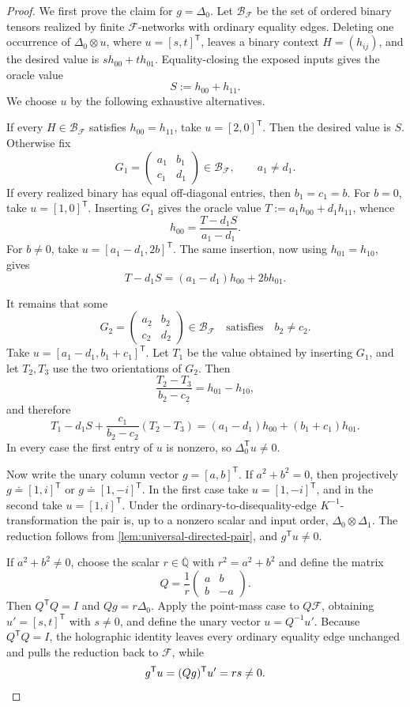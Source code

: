\documentclass[11pt,letterpaper,onecolumn]{article}
\theoremstyle{plain}
\theoremstyle{definition}
\theoremstyle{remark}
\newcommand{\AlgNums}{\overline{\mathbb Q}}
\newcommand{\cF}{\mathcal F}
\newcommand{\DeltaZero}{\Delta_0}
\newcommand{\DeltaOne}{\Delta_1}
\begin{document}
\begin{proof}
We first prove the claim for \(g=\DeltaZero\).  Let \(\mathcal B_\cF\) be
the set of ordered binary tensors realized by finite \(\cF\)-networks with
ordinary equality edges.  Deleting one occurrence of
\(\DeltaZero\otimes u\), where \(u=[s,t]^{\mathsf T}\), leaves a binary
context \(H=(h_{ij})\), and the desired value is
\(sh_{00}+th_{01}\).  Equality-closing the exposed inputs gives the oracle value
\[
  S:=h_{00}+h_{11}.
\]
We choose \(u\) by the following exhaustive alternatives.

If every \(H\in\mathcal B_\cF\) satisfies \(h_{00}=h_{11}\), take
\(u=[2,0]^{\mathsf T}\). Then the desired value is \(S\).  Otherwise fix
\[
  G_1=\begin{pmatrix}a_1&b_1\\c_1&d_1\end{pmatrix}
  \in\mathcal B_\cF,
  \qquad a_1\ne d_1.
\]
If every realized binary has equal off-diagonal entries, then
\(b_1=c_1=b\).  For \(b=0\), take \(u=[1,0]^{\mathsf T}\).  Inserting
\(G_1\) gives the oracle value \(T:=a_1h_{00}+d_1h_{11}\), whence
\[
  h_{00}=\frac{T-d_1S}{a_1-d_1}.
\]
For \(b\ne0\), take \(u=[a_1-d_1,2b]^{\mathsf T}\).  The same insertion,
now using \(h_{01}=h_{10}\), gives
\[
  T-d_1S=(a_1-d_1)h_{00}+2bh_{01}.
\]

It remains that some
\[
  G_2=\begin{pmatrix}a_2&b_2\\c_2&d_2\end{pmatrix}
  \in\mathcal B_\cF
  \quad\text{satisfies}\quad b_2\ne c_2.
\]
Take \(u=[a_1-d_1,b_1+c_1]^{\mathsf T}\).  Let \(T_1\) be the value obtained
by inserting \(G_1\), and let \(T_2,T_3\) use the two orientations of
\(G_2\).  Then
\[
  \frac{T_2-T_3}{b_2-c_2}=h_{01}-h_{10},
\]
and therefore
\[
  T_1-d_1S+
  \frac{c_1}{b_2-c_2}(T_2-T_3)
  =(a_1-d_1)h_{00}+(b_1+c_1)h_{01}.
\]
In every case the first entry of \(u\) is nonzero, so
\(\DeltaZero^{\mathsf T}u\ne0\).

Now write the unary column vector \(g=[a,b]^{\mathsf T}\).  If
\(a^2+b^2=0\), then projectively
\(g\doteq[1,i]^{\mathsf T}\) or \(g\doteq[1,-i]^{\mathsf T}\).  In the first
case take \(u=[1,-i]^{\mathsf T}\), and in the second take
\(u=[1,i]^{\mathsf T}\).  Under the ordinary-to-disequality-edge
\(K^{-1}\)-transformation the pair is, up to
a nonzero scalar and input order,
\(\DeltaZero\otimes\DeltaOne\).  The reduction follows from
\cref{lem:universal-directed-pair}, and \(g^{\mathsf T}u\ne0\).

If \(a^2+b^2\ne0\), choose the scalar \(r\in\AlgNums\) with
\(r^2=a^2+b^2\) and define the matrix
\[
  Q=\frac1r\begin{pmatrix}a&b\\b&-a\end{pmatrix}.
\]
Then \(Q^{\mathsf T}Q=I\) and \(Qg=r\DeltaZero\).  Apply the point-mass
case to \(Q\cF\), obtaining \(u'=[s,t]^{\mathsf T}\) with \(s\ne0\), and
define the unary vector \(u=Q^{-1}u'\).  Because \(Q^{\mathsf T}Q=I\), the
holographic identity leaves every ordinary equality edge unchanged and pulls
the reduction back to \(\cF\), while
\[
  g^{\mathsf T}u=(Qg)^{\mathsf T}u'=rs\ne0.\qedhere
\]
\end{proof}
\end{document}
